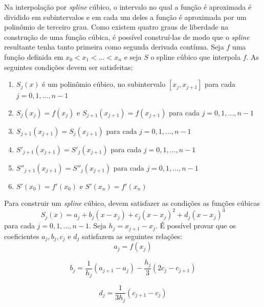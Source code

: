 \documentclass[a4paper,10pt]{article}
\begin{document}
  Na interpolação por \emph{spline} cúbico, o intervalo no qual a função é aproximada é dividido em subintervalos e em cada um deles a função é aproximada por um polinômio de terceiro grau. Como existem quatro graus de liberdade na construção de uma função cúbica, é possível construí-las de modo que o \emph{spline} resultante tenha tanto primeira como segunda derivada contínua.
  Seja $f$ uma função definida em $x_0 < x_1 < ... < x_n$ e seja $S$ o spline cúbico que interpola $f$. As seguintes condições devem ser satisfeitas:
  \begin{enumerate}
  \item $S_j(x)$ é um polinômio cúbico, no subintervalo $[x_j,x_{j+1}]$ para cada $j = 0,1,...,n-1$
  \item $S_j(x_j) = f(x_j)$ e $S_{j+1}(x_{j+1}) = f(x_{j+1}) $ para cada $j = 0,1,...,n-1$
  \item $S_{j+1}(x_{j+1})=S_j(x_{j+1})$ para cada $j = 0,1,...,n-1$
  \item $S'_{j+1}(x_{j+1})=S'_j(x_{j+1})$ para cada $j = 0,1,...,n-1$
  \item $S''_{j+1}(x_{j+1})=S''_j(x_{j+1})$ para cada $j = 0,1,...,n-1$
  \item $S'(x_0) = f'(x_0)$ e $S'(x_n) = f'(x_n)$
  \end{enumerate}
  
 
Para construir um \emph{spline} cúbico, devem satisfazer as condições as funções cúbicas
  \begin{equation}
   S_j(x) = a_j + b_j(x - x_j)+c_j(x-x_j)^2 + d_j(x-x_j)^3
   \label{eq:spline}
  \end{equation}
  para cada $j = 0, 1, ..., n-1$.
  Seja $h_j=x_{j+1}-x_j$.
  É possível provar \cite{burden} que os coeficientes $a_j, b_j, c_j$ e $d_j$ satisfazem as seguintes relações:
  \begin{equation}
   a_j = f(x_j)
  \label{eq:coef_a}
  \end{equation}
  
  \begin{equation}
  b_j = \frac{1}{h_j}(a_{j+1} - a_j) - \frac{h_j}{3}(2c_j - c_{j+1})
  \label{eq:coef_b}
  \end{equation}
  
  \begin{equation}
   d_j = \frac{1}{3h_j}(c_{j+1}-c_j)
  \label{eq:coef_d}
  \end{equation}
\end{document}
